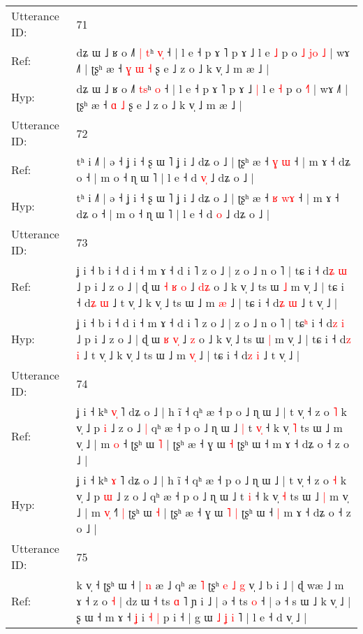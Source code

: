 \documentclass[10pt]{article}
\DeclareRobustCommand{\hl}[1]{{\textcolor{red}{#1}}}
\begin{document}
\begin{longtable}{ll}
\midrule
Utterance ID: & 71 \\
Ref: & dʑ ɯ ˩ ʁ o ˩˥ \hl{|}\hl{ }\hl{t}ʰ \hl{v}\hl{̩} ˧ | l e ˧ p ɤ ˥ p ɤ ˩\hl{}\hl{} l e \hl{˩} p o\hl{ }\hl{˩} \hl{j}\hl{o}\hl{ }\hl{˩} | wɤ ˩˥ | ʈʂʰ æ ˧\hl{ }\hl{ɣ} \hl{ɯ} \hl{˧} ʂ e ˩ z o ˩ k v̩ ˩ m æ ˩ |
 \\
Hyp: & dʑ ɯ ˩ ʁ o ˩˥ \hl{}\hl{t}\hl{s}ʰ \hl{}\hl{o} ˧ | l e ˧ p ɤ ˥ p ɤ ˩\hl{ }\hl{|} l e \hl{˧} p o\hl{}\hl{} \hl{}\hl{}\hl{˧}\hl{˥} | wɤ ˩˥ | ʈʂʰ æ ˧\hl{}\hl{} \hl{ɑ} \hl{˩} ʂ e ˩ z o ˩ k v̩ ˩ m æ ˩ |
 \\
\midrule
Utterance ID: & 72 \\
Ref: & tʰ i ˩˥ | ə ˧ ʝ i ˧ ʂ ɯ ˥ ʝ i ˩ dʑ o ˩ | ʈʂʰ æ ˧ \hl{ɣ} \hl{}\hl{ɯ} ˧ | m ɤ ˧ dʑ o ˧ | m o ˧ ɳ ɯ ˥ | l e ˧ d \hl{v}\hl{̩} ˩ dʑ o ˩ |
 \\
Hyp: & tʰ i ˩˥ | ə ˧ ʝ i ˧ ʂ ɯ ˥ ʝ i ˩ dʑ o ˩ | ʈʂʰ æ ˧ \hl{ʁ} \hl{w}\hl{ɤ} ˧ | m ɤ ˧ dʑ o ˧ | m o ˧ ɳ ɯ ˥ | l e ˧ d \hl{}\hl{o} ˩ dʑ o ˩ |
 \\
\midrule
Utterance ID: & 73 \\
Ref: & ʝ i ˧ b i ˧ d i ˧ m ɤ ˧ d i ˥ z o ˩ | z o ˩ n o ˥ | tɕ\hl{} i ˧ d\hl{ʑ} \hl{ɯ} ˩ p i ˩ z o ˩ | ɖ ɯ \hl{˧} \hl{ʁ}\hl{ }\hl{o} ˩ \hl{d}\hl{ʑ} o ˩ k v̩ ˩ ts ɯ \hl{˩} m v̩ ˩ | tɕ i ˧ d\hl{ʑ} \hl{ɯ} ˩ t v̩ ˩ k v̩ ˩ ts ɯ ˩ m \hl{}\hl{æ} ˩ | tɕ i ˧ d\hl{ʑ} \hl{ɯ} ˩ t v̩ ˩ |
 \\
Hyp: & ʝ i ˧ b i ˧ d i ˧ m ɤ ˧ d i ˥ z o ˩ | z o ˩ n o ˥ | tɕ\hl{ʰ} i ˧ d\hl{z} \hl{i} ˩ p i ˩ z o ˩ | ɖ ɯ \hl{ʁ} \hl{}\hl{v}\hl{̩} ˩ \hl{}\hl{z} o ˩ k v̩ ˩ ts ɯ \hl{|} m v̩ ˩ | tɕ i ˧ d\hl{z} \hl{i} ˩ t v̩ ˩ k v̩ ˩ ts ɯ ˩ m \hl{v}\hl{̩} ˩ | tɕ i ˧ d\hl{z} \hl{i} ˩ t v̩ ˩ |
 \\
\midrule
Utterance ID: & 74 \\
Ref: & ʝ i ˧ kʰ \hl{v}\hl{̩} ˥ dʑ o ˩ | h ĩ ˧ qʰ æ ˧ p o ˩ ɳ ɯ ˩ | t v̩ ˧ z o \hl{˥} k v̩ ˩ p \hl{i} ˩ z o ˩\hl{ }\hl{|} qʰ æ ˧ p o ˩ ɳ ɯ ˩\hl{ }\hl{|} t \hl{v}\hl{̩} ˧ k v̩ \hl{˥} ts ɯ ˩\hl{}\hl{} m v̩ ˩ | m \hl{}\hl{o} ˧\hl{}\hl{}\hl{} ʈʂʰ ɯ \hl{˥} | ʈʂʰ æ ˧ ɣ ɯ\hl{}\hl{} \hl{˧} ʈʂʰ ɯ ˧\hl{}\hl{} m ɤ ˧ dʑ o ˧ z o ˩ |
 \\
Hyp: & ʝ i ˧ kʰ \hl{}\hl{ɤ} ˥ dʑ o ˩ | h ĩ ˧ qʰ æ ˧ p o ˩ ɳ ɯ ˩ | t v̩ ˧ z o \hl{˧} k v̩ ˩ p \hl{ɯ} ˩ z o ˩\hl{}\hl{} qʰ æ ˧ p o ˩ ɳ ɯ ˩\hl{}\hl{} t \hl{}\hl{i} ˧ k v̩ \hl{˧} ts ɯ ˩\hl{ }\hl{|} m v̩ ˩ | m \hl{v}\hl{̩} ˧\hl{˥}\hl{ }\hl{|} ʈʂʰ ɯ \hl{˧} | ʈʂʰ æ ˧ ɣ ɯ\hl{ }\hl{˥} \hl{|} ʈʂʰ ɯ ˧\hl{ }\hl{|} m ɤ ˧ dʑ o ˧ z o ˩ |
 \\
\midrule
Utterance ID: & 75 \\
Ref: & k v̩ ˧ ʈʂʰ ɯ ˧ | \hl{n} æ ˩ qʰ æ \hl{˥} ʈʂʰ\hl{ }\hl{e} \hl{˩} \hl{g} v̩ ˩ b i ˩ | ɖ wæ ˩ m ɤ ˧ z o \hl{˧} | dz ɯ ˧ ts \hl{ɑ} ˥ ɲ i ˩ | ə ˧ ts \hl{o} ˧ | ə ˧ s ɯ ˩ k v̩ ˩ | \hl{}ʂ\hl{} ɯ ˧ m ɤ ˧\hl{ }\hl{ʝ} i\hl{ }\hl{˧} \hl{|} p i ˧ | g ɯ\hl{ }\hl{˩}\hl{ }\hl{ʝ}\hl{ }\hl{i} ˥ | l e ˧ d v̩ ˩ |

\end{longtable}
\end{document}
